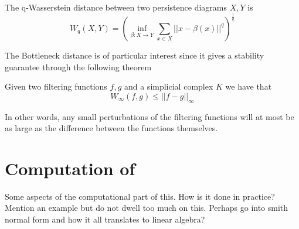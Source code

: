   \begin{definition}
    The q-Wasserstein distance between two persistence diagrams $X,Y$ is
    \[W_{q}(X,Y) = (\inf_{\beta: X \to Y} \sum_{x \in X}  ||x-\beta(x)||^{q})^{\frac{1}{q}}\]
  \end{definition}
The Bottleneck distance is of particular interest since it gives a stability guarantee through the following theorem
  \begin{theorem}
    Given two filtering functions $f,g$ and a simplicial complex $K$ we have that
    \[W_{\infty}(f,g) \leq ||f-g||_{\infty}\]
  \end{theorem}
  In other words, any small perturbations of the filtering functions will at most be as large as the difference between the functions themselves.
\section{Computation of }
Some aspects of the computational part of this. How is it done in practice? Mention an example but do not dwell too much on this. Perhaps go into smith normal form and how it all translates to linear algebra?
